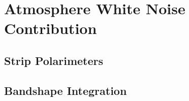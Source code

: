 \chapter{Atmosphere White Noise Contribution}

\section{Strip Polarimeters}

\section{Bandshape Integration}

